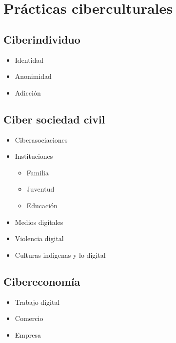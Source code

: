 \documentclass[]{book}
\providecommand{\tightlist}{%
  \setlength{\itemsep}{0pt}\setlength{\parskip}{0pt}}
\begin{document}
\hypertarget{pruxe1cticas-ciberculturales}{%
\chapter{Prácticas ciberculturales}\label{pruxe1cticas-ciberculturales}}

\hypertarget{ciberindividuo}{%
\section{Ciberindividuo}\label{ciberindividuo}}

\begin{itemize}
\tightlist
\item
  Identidad
\item
  Anonimidad
\item
  Adicción
\end{itemize}

\hypertarget{ciber-sociedad-civil}{%
\section{Ciber sociedad civil}\label{ciber-sociedad-civil}}

\begin{itemize}
\tightlist
\item
  Ciberasociaciones
\item
  Instituciones

  \begin{itemize}
  \tightlist
  \item
    Familia
  \item
    Juventud
  \item
    Educación
  \end{itemize}
\item
  Medios digitales
\item
  Violencia digital
\item
  Culturas indigenas y lo digital
\end{itemize}

\hypertarget{cibereconomuxeda}{%
\section{Cibereconomía}\label{cibereconomuxeda}}

\begin{itemize}
\tightlist
\item
  Trabajo digital
\item
  Comercio
\item
  Empresa
\end{itemize}
\end{document}
